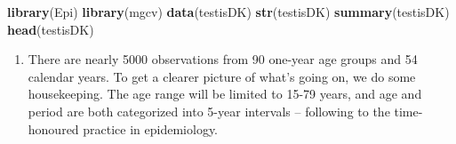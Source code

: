 \documentclass[
]{book}
\newenvironment{Shaded}{\begin{snugshade}}{\end{snugshade}}
\newcommand{\AttributeTok}[1]{\textcolor[rgb]{0.13,0.29,0.53}{#1}}
\newcommand{\ConstantTok}[1]{\textcolor[rgb]{0.56,0.35,0.01}{#1}}
\newcommand{\DecValTok}[1]{\textcolor[rgb]{0.00,0.00,0.81}{#1}}
\newcommand{\FunctionTok}[1]{\textcolor[rgb]{0.13,0.29,0.53}{\textbf{#1}}}
\newcommand{\NormalTok}[1]{#1}
\newcommand{\OtherTok}[1]{\textcolor[rgb]{0.56,0.35,0.01}{#1}}
\newcommand{\SpecialCharTok}[1]{\textcolor[rgb]{0.81,0.36,0.00}{\textbf{#1}}}
\providecommand{\tightlist}{%
  \setlength{\itemsep}{0pt}\setlength{\parskip}{0pt}}
\begin{document}
\begin{Shaded}
\begin{Highlighting}[]
\FunctionTok{library}\NormalTok{(Epi)}
\FunctionTok{library}\NormalTok{(mgcv)}
\FunctionTok{data}\NormalTok{(testisDK)}
\FunctionTok{str}\NormalTok{(testisDK)}
\FunctionTok{summary}\NormalTok{(testisDK)}
\FunctionTok{head}\NormalTok{(testisDK)}
\end{Highlighting}
\end{Shaded}

\begin{enumerate}
\def\labelenumi{\arabic{enumi}.}
\setcounter{enumi}{1}
\tightlist
\item
  There are nearly 5000 observations from 90 one-year age groups
  and 54 calendar years. To get a clearer picture of what's going on,
  we do some housekeeping. The age range will be limited to 15-79
  years, and age and period are both categorized into 5-year intervals -- following to the time-honoured practice in epidemiology.
\end{enumerate}

\begin{Shaded}
\end{Shaded}
\end{document}
